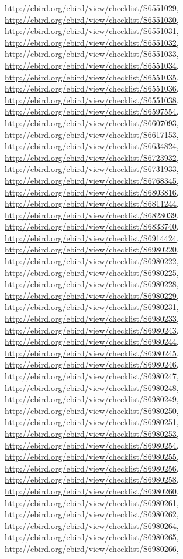 \documentclass[9pt, article]{memoir}
\begin{document}
\begin{multicols}{2}
\url{http://ebird.org/ebird/view/checklist/S6551029}, 
\url{http://ebird.org/ebird/view/checklist/S6551030}, 
\url{http://ebird.org/ebird/view/checklist/S6551031}, 
\url{http://ebird.org/ebird/view/checklist/S6551032}, 
\url{http://ebird.org/ebird/view/checklist/S6551033}, 
\url{http://ebird.org/ebird/view/checklist/S6551034}, 
\url{http://ebird.org/ebird/view/checklist/S6551035}, 
\url{http://ebird.org/ebird/view/checklist/S6551036}, 
\url{http://ebird.org/ebird/view/checklist/S6551038}, 
\url{http://ebird.org/ebird/view/checklist/S6597554}, 
\url{http://ebird.org/ebird/view/checklist/S6607093}, 
\url{http://ebird.org/ebird/view/checklist/S6617153}, 
\url{http://ebird.org/ebird/view/checklist/S6634824}, 
\url{http://ebird.org/ebird/view/checklist/S6723932}, 
\url{http://ebird.org/ebird/view/checklist/S6731933}, 
\url{http://ebird.org/ebird/view/checklist/S6768345}, 
\url{http://ebird.org/ebird/view/checklist/S6803816}, 
\url{http://ebird.org/ebird/view/checklist/S6811244}, 
\url{http://ebird.org/ebird/view/checklist/S6828039}, 
\url{http://ebird.org/ebird/view/checklist/S6833740}, 
\url{http://ebird.org/ebird/view/checklist/S6914424}, 
\url{http://ebird.org/ebird/view/checklist/S6980220}, 
\url{http://ebird.org/ebird/view/checklist/S6980222}, 
\url{http://ebird.org/ebird/view/checklist/S6980225}, 
\url{http://ebird.org/ebird/view/checklist/S6980228}, 
\url{http://ebird.org/ebird/view/checklist/S6980229}, 
\url{http://ebird.org/ebird/view/checklist/S6980231}, 
\url{http://ebird.org/ebird/view/checklist/S6980233}, 
\url{http://ebird.org/ebird/view/checklist/S6980243}, 
\url{http://ebird.org/ebird/view/checklist/S6980244}, 
\url{http://ebird.org/ebird/view/checklist/S6980245}, 
\url{http://ebird.org/ebird/view/checklist/S6980246}, 
\url{http://ebird.org/ebird/view/checklist/S6980247}, 
\url{http://ebird.org/ebird/view/checklist/S6980248}, 
\url{http://ebird.org/ebird/view/checklist/S6980249}, 
\url{http://ebird.org/ebird/view/checklist/S6980250}, 
\url{http://ebird.org/ebird/view/checklist/S6980251}, 
\url{http://ebird.org/ebird/view/checklist/S6980253}, 
\url{http://ebird.org/ebird/view/checklist/S6980254}, 
\url{http://ebird.org/ebird/view/checklist/S6980255}, 
\url{http://ebird.org/ebird/view/checklist/S6980256}, 
\url{http://ebird.org/ebird/view/checklist/S6980258}, 
\url{http://ebird.org/ebird/view/checklist/S6980260}, 
\url{http://ebird.org/ebird/view/checklist/S6980261}, 
\url{http://ebird.org/ebird/view/checklist/S6980262}, 
\url{http://ebird.org/ebird/view/checklist/S6980264}, 
\url{http://ebird.org/ebird/view/checklist/S6980265}, 
\url{http://ebird.org/ebird/view/checklist/S6980266}, 

\end{multicols}
\end{document}
